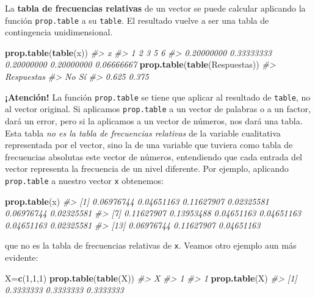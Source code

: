 \documentclass[
]{book}
\newenvironment{Shaded}{\begin{snugshade}}{\end{snugshade}}
\newcommand{\CommentTok}[1]{\textcolor[rgb]{0.56,0.35,0.01}{\textit{#1}}}
\newcommand{\DecValTok}[1]{\textcolor[rgb]{0.00,0.00,0.81}{#1}}
\newcommand{\KeywordTok}[1]{\textcolor[rgb]{0.13,0.29,0.53}{\textbf{#1}}}
\newcommand{\NormalTok}[1]{#1}
\theoremstyle{definition}
\theoremstyle{definition}
\theoremstyle{definition}
\theoremstyle{remark}
\begin{document}
La \textbf{tabla de frecuencias relativas} de un vector se puede calcular aplicando la función \texttt{prop.table} a su \texttt{table}. El resultado vuelve a ser una tabla de contingencia unidimensional.

\begin{Shaded}
\begin{Highlighting}[]
\KeywordTok{prop.table}\NormalTok{(}\KeywordTok{table}\NormalTok{(x))}
\CommentTok{\#\textgreater{} x}
\CommentTok{\#\textgreater{}          1          2          3          5          6 }
\CommentTok{\#\textgreater{} 0.20000000 0.33333333 0.20000000 0.20000000 0.06666667}
\KeywordTok{prop.table}\NormalTok{(}\KeywordTok{table}\NormalTok{(Respuestas))}
\CommentTok{\#\textgreater{} Respuestas}
\CommentTok{\#\textgreater{}    No    Sí }
\CommentTok{\#\textgreater{} 0.625 0.375}
\end{Highlighting}
\end{Shaded}

\textbf{¡Atención!} La función \texttt{prop.table} se tiene que aplicar al resultado de \texttt{table}, no al vector original. Si aplicamos \texttt{prop.table} a un vector de palabras o a un factor, dará un error, pero si la aplicamos a un vector de números, nos dará una tabla. Esta tabla \emph{no es la tabla de frecuencias relativas} de la variable cualitativa representada por el vector, sino la de una variable que tuviera como tabla de frecuencias absolutas este vector de números, entendiendo que cada entrada del vector representa la frecuencia de un nivel diferente. Por ejemplo, aplicando \texttt{prop.table} a nuestro vector \texttt{x} obtenemos:

\begin{Shaded}
\begin{Highlighting}[]
\KeywordTok{prop.table}\NormalTok{(x)}
\CommentTok{\#\textgreater{}  [1] 0.06976744 0.04651163 0.11627907 0.02325581 0.06976744 0.02325581}
\CommentTok{\#\textgreater{}  [7] 0.11627907 0.13953488 0.04651163 0.04651163 0.04651163 0.02325581}
\CommentTok{\#\textgreater{} [13] 0.06976744 0.11627907 0.04651163}
\end{Highlighting}
\end{Shaded}

que no es la tabla de frecuencias relativas de \texttt{x}. Veamos otro ejemplo aun más evidente:

\begin{Shaded}
\begin{Highlighting}[]
\NormalTok{X=}\KeywordTok{c}\NormalTok{(}\DecValTok{1}\NormalTok{,}\DecValTok{1}\NormalTok{,}\DecValTok{1}\NormalTok{)}
\KeywordTok{prop.table}\NormalTok{(}\KeywordTok{table}\NormalTok{(X))}
\CommentTok{\#\textgreater{} X}
\CommentTok{\#\textgreater{} 1 }
\CommentTok{\#\textgreater{} 1}
\KeywordTok{prop.table}\NormalTok{(X)}
\CommentTok{\#\textgreater{} [1] 0.3333333 0.3333333 0.3333333}
\end{Highlighting}
\end{Shaded}
\end{document}
